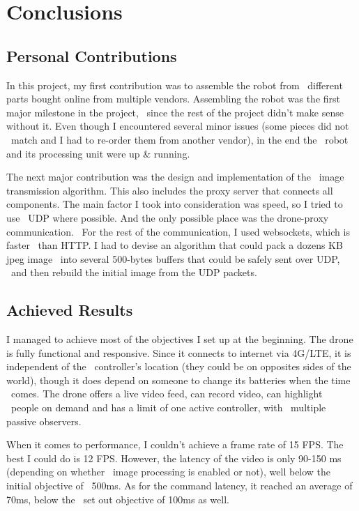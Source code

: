 
\chapter{Conclusions}
\label{ch:conclusions}

\section{Personal Contributions}
\label{sec:personal-contributions}

In this project, my first contribution was to assemble the robot from \
different parts bought online from multiple vendors.
Assembling the robot was the first major milestone in the project, \
since the rest of the project didn't make sense without it.
Even though I encountered several minor issues (some pieces did not \
match and I had to re-order them from another vendor), in the end the \
robot and its processing unit were up \& running.

The next major contribution was the design and implementation of the \
image transmission algorithm.
This also includes the proxy server that connects all components.
The main factor I took into consideration was speed, so I tried to use \
UDP where possible.
And the only possible place was the drone-proxy communication. \
For the rest of the communication, I used websockets, which is faster \
than HTTP.
I had to devise an algorithm that could pack a dozens KB jpeg image \
into several 500-bytes buffers that could be safely sent over UDP, \
and then rebuild the initial image from the UDP packets.


\section{Achieved Results}
\label{sec:conclusions-achieved-results}
I managed to achieve most of the objectives I set up at the beginning.
The drone is fully functional and responsive.
Since it connects to internet via 4G/LTE, it is independent of the \
controller's location (they could be on opposites sides of the world),
though it does depend on someone to change its batteries when the time \
comes.
The drone offers a live video feed, can record video, can highlight \
people on demand and has a limit of one active controller, with \
multiple passive observers.

When it comes to performance, I couldn't achieve a frame rate of 15 FPS.
The best I could do is 12 FPS.
However, the latency of the video is only 90-150 ms (depending on whether \
image processing is enabled or not), well below the initial objective of \
500ms.
As for the command latency, it reached an average of 70ms, below the \
set out objective of 100ms as well.

